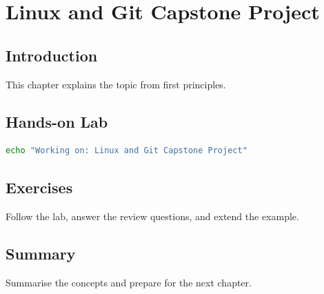 \chapter{Linux and Git Capstone Project}
\label{chap:vol2-15}



\section{Introduction}
This chapter explains the topic from first principles.

\section{Hands-on Lab}
\begin{lstlisting}[language=bash]
echo "Working on: Linux and Git Capstone Project"
\end{lstlisting}

\section{Exercises}
\begin{exercise}
Follow the lab, answer the review questions, and extend the example.
\end{exercise}

\section{Summary}
Summarise the concepts and prepare for the next chapter.
